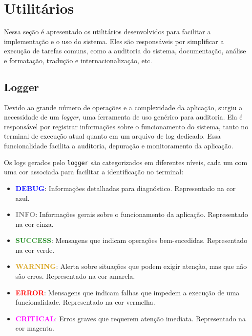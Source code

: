 \section{Utilitários}
\label{sec:3:utils}

\newcommand\urlGhPages{https://docs.github.com/en/pages}
\newcommand\URLGhActions{https://docs.github.com/en/actions}
\newcommand\urlMkdocs{https://www.mkdocs.org/}
\newcommand\urlRuff{https://docs.astral.sh/ruff/}
\newcommand\urlIEign{https://pypi.org/project/python-i18n/}

Nessa seção é apresentado os utilitários desenvolvidos para facilitar a implementação e o uso do sistema. Eles são responsáveis por simplificar a execução de tarefas comuns, como a auditoria do sistema, documentação, análise e formatação, tradução e internacionalização, etc.

\subsection{Logger}

Devido ao grande número de operações e a complexidade da aplicação, surgiu a necessidade de um \textit{logger}, uma ferramenta de uso genérico para auditoria. Ela é responsável por registrar informações sobre o funcionamento do sistema, tanto no terminal de execução atual quanto em um arquivo de log dedicado. Essa funcionalidade facilita a auditoria, depuração e monitoramento da aplicação.

Os logs gerados pelo \texttt{logger} são categorizados em diferentes níveis, cada um com uma cor associada para facilitar a identificação no terminal:

\begin{itemize}
    \item \textbf{\textcolor{blue}{DEBUG}}: Informações detalhadas para diagnóstico. Representado na cor azul.
    \item \textbf{\textcolor{gray}{INFO}}: Informações gerais sobre o funcionamento da aplicação. Representado na cor cinza.
    \item \textbf{\textcolor{ForestGreen}{SUCCESS}}: Mensagens que indicam operações bem-sucedidas. Representado na cor verde.
    \item \textbf{\textcolor{Goldenrod}{WARNING}}: Alerta sobre situações que podem exigir atenção, mas que não são erros. Representado na cor amarela.
    \item \textbf{\textcolor{red}{ERROR}}: Mensagens que indicam falhas que impedem a execução de uma funcionalidade. Representado na cor vermelha.
    \item \textbf{\textcolor{magenta}{CRITICAL}}: Erros graves que requerem atenção imediata. Representado na cor magenta.
\end{itemize}

